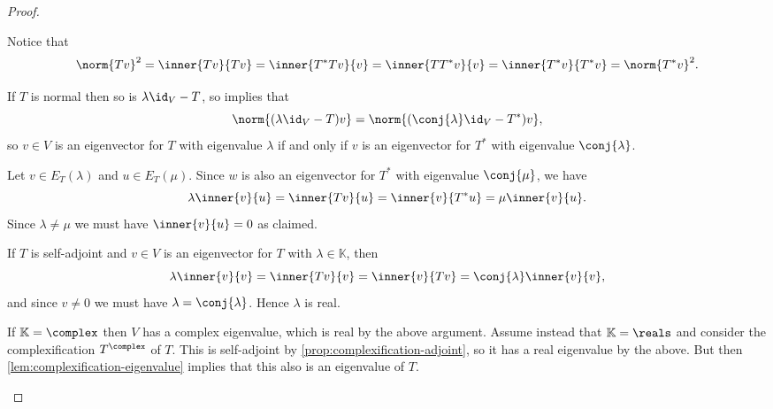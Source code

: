 \documentclass[article, a4paper, 11pt, oneside]{memoir}
\numberwithin{equation}{chapter}
\begin{document}
\begin{proof}
\begin{proofsec}
    \item[Proof of \subcref{enum:normal-adjoint-norm}]
    Notice that
    \begin{equation*}
        \norm{Tv}^2
            = \inner{Tv}{Tv}
            = \inner{T^*Tv}{v}
            = \inner{TT^*v}{v}
            = \inner{T^*v}{T^*v}
            = \norm{T^*v}^2.
    \end{equation*}

    \item[Proof of \subcref{enum:normal-adjoint-eigenvalues}]
    If $T$ is normal then so is $\lambda \id_V - T$, so  implies that
    \begin{equation*}
        \norm{(\lambda \id_V - T)v}
            = \norm{(\conj{\lambda} \id_V - T^*)v},
    \end{equation*}
    so $v \in V$ is an eigenvector for $T$ with eigenvalue $\lambda$ if and only if $v$ is an eigenvector for $T^*$ with eigenvalue $\conj{\lambda}$.

    \item[Proof of \subcref{enum:normal-orthogonal-eigenspaces}]
    Let $v \in E_T(\lambda)$ and $u \in E_T(\mu)$. Since $w$ is also an eigenvector for $T^*$ with eigenvalue $\conj{\mu}$, we have
    \begin{equation*}
        \lambda \inner{v}{u}
            = \inner{Tv}{u}
            = \inner{v}{T^*u}
            = \mu \inner{v}{u}.
    \end{equation*}
    Since $\lambda \neq \mu$ we must have $\inner{v}{u} = 0$ as claimed.

    \item[Proof of \subcref{enum:self-adjoint-eigenvalues-exists-and-real}]
    If $T$ is self-adjoint and $v \in V$ is an eigenvector for $T$ with $\lambda \in \mathbb{K}$, then
    \begin{equation*}
        \lambda \inner{v}{v}
            = \inner{Tv}{v}
            = \inner{v}{Tv}
            = \conj{\lambda} \inner{v}{v},
    \end{equation*}
    and since $v \neq 0$ we must have $\lambda = \conj{\lambda}$. Hence $\lambda$ is real.

    If $\mathbb{K} = \complex$ then $V$ has a complex eigenvalue, which is real by the above argument. Assume instead that $\mathbb{K} = \reals$ and consider the complexification $T^\complex$ of $T$. This is self-adjoint by \cref{prop:complexification-adjoint}, so it has a real eigenvalue by the above. But then \cref{lem:complexification-eigenvalue} implies that this also is an eigenvalue of $T$.
    

\end{proofsec}
\end{proof}
\end{document}
